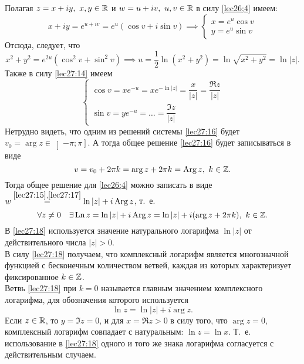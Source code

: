 \documentclass[../../main.tex]{subfiles}
\begin{document}
Полагая $ z = x + iy,\ x, y \in \mathbb{R} $ и $ w = u + iv,\ u, v \in \mathbb{R} $
в силу \eqref{lec26;4} имеем:
\begin{equation}
\label{lec27:14}
x + iy = e^{u + iv} = e^u(\cos v + i\sin v) \implies
\begin{cases}
	x = e^u\cos v\\
	y = e^u\sin v
\end{cases}
\end{equation}
Отсюда, следует, что 
\begin{equation}
\label{lec27:15}
x^2 + y^2 = e^{2u}
(\cos^2 v + \sin^2 v) \implies 
u = \dfrac{1}{2} \ln(x^2 + y^2) = 
\ln \sqrt{x^2 + y^2} = \ln|z|.
\end{equation}
Также в силу \eqref{lec27:14} имеем
\begin{equation}
\label{lec27:16}
\begin{cases}
\cos v = xe^{-u} = xe^{-\ln|z|} = \dfrac{x}{|z|} = \dfrac{\Re z}{|z|}\\
\sin v = ye^{-u} = \dots = \dfrac{\Im z}{|z|}
\end{cases}
\end{equation}
Нетрудно видеть, что одним из решений системы \eqref{lec27:16} будет 
$ v_0 = \arg z \in \left]-\pi; \pi\right] $. А тогда общее решение \eqref{lec27:16}
будет записываться в виде
\begin{equation}
\label{lec27:17}
v = v_0 + 2\pi k = \arg z + 2\pi k = \operatorname{Arg} z,\ k \in \mathbb{Z}.
\end{equation}
Тогда общее решение для \eqref{lec26;4} можно записать в виде $w 
\stackrel{\eqref{lec27:15}, \eqref{lec27:17}}{=}
\ln |z| + i \operatorname{Arg} z$, т.~е.
\begin{equation}
\label{lec27:18}
\forall z \neq 0 \quad \exists \operatorname{Ln} z = \ln |z| + i \operatorname{Arg} z = 
\ln |z| + i(\arg z + 2\pi k),\ k \in \mathbb{Z}.
\end{equation}
В \eqref{lec27:18} используется значение натурального логарифма
$ \ln|z| $ от действительного числа $ |z| > 0 $.\\
В силу \eqref{lec27:18} получаем, что комплексный логарифм является 
многозначной функцией с бесконечным количеством ветвей, каждая из которых
характеризует фиксированное $ k\in\mathbb{Z} $.\\
Ветвь \eqref{lec27:18} при $ k = 0 $ называется главным значением комплексного
логарифма, для обозначения которого используется 
\begin{equation}
\label{lec27:19}
\ln z = \ln|z| + i\arg z.
\end{equation}
Если $ z \in \mathbb{R} $, то $ y = \Im z = 0 $, и для 
$ x = \Re z > 0 $ в силу того, что $ \arg z = 0 $, комплексный логарифм
совпадает с натуральным: $ \ln z = \ln x $. Т.~е. использование в 
\eqref{lec27:18} одного и того же знака логарифма согласуется с действительным
случаем.
\end{document}
